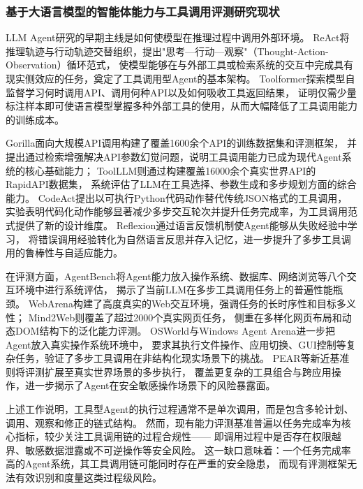 \subsubsection{基于大语言模型的智能体能力与工具调用评测研究现状}

LLM Agent研究的早期主线是如何使模型在推理过程中调用外部环境。
ReAct\cite{yao2023react}将推理轨迹与行动轨迹交替组织，提出"思考—行动—观察"（Thought-Action-Observation）循环范式，
使模型能够在与外部工具或检索系统的交互中完成具有现实侧效应的任务，奠定了工具调用型Agent的基本架构。
Toolformer\cite{schick2023toolformer}探索模型自监督学习何时调用API、调用何种API以及如何吸收工具返回结果，
证明仅需少量标注样本即可使语言模型掌握多种外部工具的使用，从而大幅降低了工具调用能力的训练成本。

Gorilla\cite{patil2024gorilla}面向大规模API调用构建了覆盖1600余个API的训练数据集和评测框架，
并提出通过检索增强解决API参数幻觉问题，说明工具调用能力已成为现代Agent系统的核心基础能力；
ToolLLM\cite{qin2024toolllm}则通过构建覆盖16000余个真实世界API的RapidAPI数据集，
系统评估了LLM在工具选择、参数生成和多步规划方面的综合能力。
CodeAct\cite{wang2024codeact}提出以可执行Python代码动作替代传统JSON格式的工具调用，
实验表明代码化动作能够显著减少多步交互轮次并提升任务完成率，为工具调用范式提供了新的设计维度。
Reflexion\cite{shinn2023reflexion}通过语言反馈机制使Agent能够从失败经验中学习，
将错误调用经验转化为自然语言反思并存入记忆，进一步提升了多步工具调用的鲁棒性与自适应能力。

在评测方面，AgentBench\cite{liu2024agentbench}将Agent能力放入操作系统、数据库、网络浏览等八个交互环境中进行系统评估，
揭示了当前LLM在多步工具调用任务上的普遍性能瓶颈。
WebArena\cite{zhou2023webarena}构建了高度真实的Web交互环境，强调任务的长时序性和目标多义性；
Mind2Web\cite{deng2023mind2web}则覆盖了超过2000个真实网页任务，
侧重在多样化网页布局和动态DOM结构下的泛化能力评测。
OSWorld\cite{xie2024osworld}与Windows Agent Arena\cite{bonatti2025windows}进一步把Agent放入真实操作系统环境中，
要求其执行文件操作、应用切换、GUI控制等复杂任务，验证了多步工具调用在非结构化现实场景下的挑战。
PEAR\cite{dong2026pear}等新近基准则将评测扩展至真实世界场景的多步执行，
覆盖更复杂的工具组合与跨应用操作，进一步揭示了Agent在安全敏感操作场景下的风险暴露面。

上述工作说明，工具型Agent的执行过程通常不是单次调用，而是包含多轮计划、调用、观察和修正的链式结构。
然而，现有能力评测基准普遍以任务完成率为核心指标，较少关注工具调用链的过程合规性——
即调用过程中是否存在权限越界、敏感数据泄露或不可逆操作等安全风险。
这一缺口意味着：一个任务完成率高的Agent系统，其工具调用链可能同时存在严重的安全隐患，
而现有评测框架无法有效识别和度量这类过程级风险。
